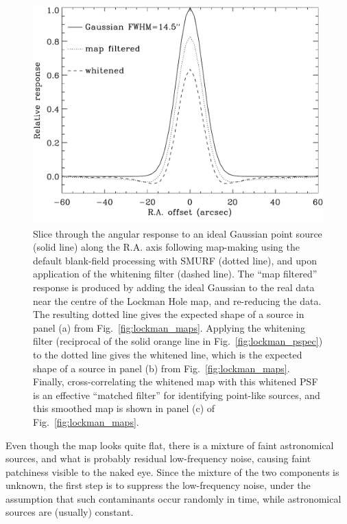 \documentclass[useAMS,usenatbib,nofootinbib]{mn2e}
\begin{document}
\begin{figure}
\centering
\includegraphics[width=\linewidth]{lockman_psf.pdf}
\caption{Slice through the angular response to an ideal Gaussian point
  source (solid line) along the R.A. axis following map-making using
  the default blank-field processing with SMURF (dotted line), and
  upon application of the whitening filter (dashed line). The ``map
  filtered'' response is produced by adding the ideal Gaussian to the
  real data near the centre of the Lockman Hole map, and re-reducing
  the data. The resulting dotted line gives the expected shape of a
  source in panel (a) from Fig.~\ref{fig:lockman_maps}. Applying the
  whitening filter (reciprocal of the solid orange line in
  Fig.~\ref{fig:lockman_pspec}) to the dotted line gives the whitened
  line, which is the expected shape of a source in panel (b) from
  Fig.~\ref{fig:lockman_maps}. Finally, cross-correlating the whitened
  map with this whitened PSF is an effective ``matched filter'' for
  identifying point-like sources, and this smoothed map is shown in
  panel (c) of Fig.~\ref{fig:lockman_maps}.}
\label{fig:lockman_psf}
\end{figure}

Even though the map looks quite flat, there is a mixture of faint
astronomical sources, and what is probably residual low-frequency
noise, causing faint patchiness visible to the naked eye. Since the
mixture of the two components is unknown, the first step is to
suppress the low-frequency noise, under the assumption that such
contaminants occur randomly in time, while astronomical sources are
(usually) constant.
\end{document}
